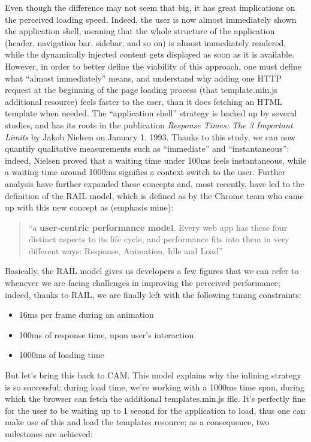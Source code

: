 \documentclass[12pt,svgnames]{memoir}
\newenvironment{quotationb}%
{\color{maincolor}\begin{leftbar}\begin{quotation}}%
{\end{quotation}\end{leftbar}\ignorespacesafterend}
\begin{document}
Even though the difference may not seem that big, it has great
implications on the perceived loading speed. Indeed, the user is now
almost immediately shown the application shell, meaning that the whole
structure of the application (header, navigation bar, sidebar, and so
on) is almost immediately rendered, while the dynamically injected
content gets displayed as soon as it is available. However, in order to
better define the viability of this approach, one must define what
``almost immediately'' means, and understand why adding one HTTP request
at the beginning of the page loading process (that template.min.js
additional resource) feels faster to the user, than it does fetching an
HTML template when needed. The ``application shell'' strategy is backed
up by several studies, and has its roots in the publication
\emph{Response Times: The 3 Important Limits} by Jakob Nielsen on
January 1, 1993. Thanks to this study, we can now quantify qualitative
measurements such as ``immediate'' and ``instantaneous'': indeed,
Nielsen proved that a waiting time under 100ms feels instantaneous,
while a waiting time around 1000ms signifies a context switch to the
user. Further analysis have further expanded these concepts and, most
recently, have led to the definition of the RAIL model, which is defined
as by the Chrome team who came up with this new concept as (emphasis
mine):

\begin{quotationb}
``a \textbf{user-centric performance model}. Every web app has these
four distinct aspects to its life cycle, and performance fits into them
in very different ways: Response, Animation, Idle and Load''
\end{quotationb}

Basically, the RAIL model gives us developers a few figures that we can
refer to whenever we are facing challenges in improving the perceived
performance; indeed, thanks to RAIL, we are finally left with the
following timing constraints:

\begin{itemize}
\itemsep1pt\parskip0pt
\item
  16ms per frame during an animation
\item
  100ms of response time, upon user's interaction
\item
  1000ms of loading time
\end{itemize}

But let's bring this back to CAM. This model explains why the inlining
strategy is so successful: during load time, we're working with a 1000ms
time span, during which the browser can fetch the additional
templates.min.js file. It's perfectly fine for the user to be waiting up
to 1 second for the application to load, thus one can make use of this
and load the templates resource; as a consequence, two milestones are
achieved:
\end{document}
